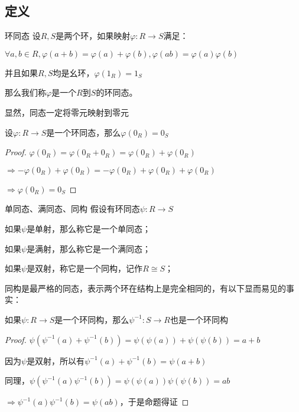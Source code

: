 \documentclass[12pt, a4paper, oneside, UTF8]{ctexbook}
\begin{document}
		\subsection{定义}
			\begin{defn}{环同态}{}
				设$R,S$是两个环，如果映射$\varphi : R \rightarrow S$满足：

				$\forall a,b \in R,\varphi (a+b)=\varphi (a)+\varphi (b),\varphi (ab)=\varphi (a)\varphi (b)$

				并且如果$R,S$均是幺环，$\varphi (1_R)=1_S$
				
				那么我们称$\varphi $是一个$R$到$S$的环同态。
			\end{defn}
			显然，同态一定将零元映射到零元
			\begin{proposition}
				设$\varphi : R \rightarrow S$是一个环同态，那么$\varphi (0_R) = 0_S$
			\end{proposition}
			\begin{proof}
				$\varphi (0_R) = \varphi (0_R + 0_R) = \varphi (0_R) + \varphi (0_R)$

				$\Rightarrow -\varphi (0_R)+\varphi (0_R) = -\varphi (0_R)+\varphi (0_R)+\varphi (0_R)$

				$\Rightarrow \varphi (0_R)=0_S$
			\end{proof}
			\begin{defn}{单同态、满同态、同构}{}
				假设有环同态$\psi :R \rightarrow S$

				如果$\psi $是单射，那么称它是一个单同态；

				如果$\psi $是满射，那么称它是一个满同态；

				如果$\psi $是双射，称它是一个同构，记作$R \cong S$；
			\end{defn}
			同构是最严格的同态，表示两个环在结构上是完全相同的，有以下显而易见的事实：
			\begin{proposition}
				如果$\psi : R \rightarrow S$是一个环同构，那么$\psi^{-1} : S \rightarrow R$也是一个环同构
			\end{proposition}
			\begin{proof}
				$\psi \left(\psi^{-1} (a)+\psi^{-1} (b)\right)=\psi \left(\psi (a)\right)+\psi \left(\psi (b)\right)=a+b$

				因为$\psi $是双射，所以有$\psi^{-1} (a)+\psi^{-1} (b)=\psi (a+b)$

				同理，$\psi \left(\psi^{-1} (a)\psi^{-1} (b)\right)=\psi \left(\psi (a)\right)\psi \left(\psi (b)\right)=ab$

				$\Rightarrow \psi^{-1} (a)\psi^{-1} (b)=\psi (ab)$，于是命题得证
			\end{proof}
\end{document}
